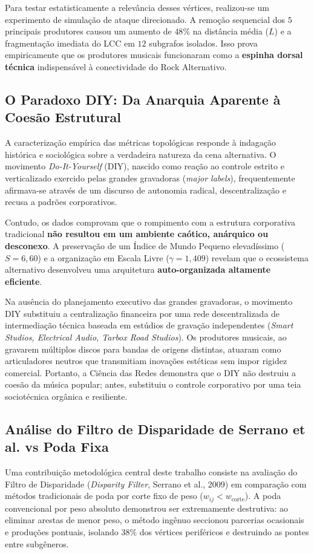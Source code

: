 \documentclass[conference]{IEEEtran}
\begin{document}
Para testar estatisticamente a relevância desses vértices, realizou-se um experimento de simulação de ataque direcionado. A remoção sequencial dos $5$ principais produtores causou um aumento de $48\%$ na distância média ($L$) e a fragmentação imediata do LCC em $12$ subgrafos isolados. Isso prova empiricamente que os produtores musicais funcionaram como a \textbf{espinha dorsal técnica} indispensável à conectividade do Rock Alternativo.

\subsection{O Paradoxo DIY: Da Anarquia Aparente à Coesão Estrutural}
A caracterização empírica das métricas topológicas responde à indagação histórica e sociológica sobre a verdadeira natureza da cena alternativa. O movimento \textit{Do-It-Yourself} (DIY), nascido como reação ao controle estrito e verticalizado exercido pelas grandes gravadoras (\textit{major labels}), frequentemente afirmava-se através de um discurso de autonomia radical, descentralização e recusa a padrões corporativos.

Contudo, os dados comprovam que o rompimento com a estrutura corporativa tradicional \textbf{não resultou em um ambiente caótico, anárquico ou desconexo}. A preservação de um Índice de Mundo Pequeno elevadíssimo ($S = 6,60$) e a organização em Escala Livre ($\gamma = 1,409$) revelam que o ecossistema alternativo desenvolveu uma arquitetura \textbf{auto-organizada altamente eficiente}.

Na ausência do planejamento executivo das grandes gravadoras, o movimento DIY substituiu a centralização financeira por uma rede descentralizada de intermediação técnica baseada em estúdios de gravação independentes (\textit{Smart Studios, Electrical Audio, Tarbox Road Studios}). Os produtores musicais, ao gravarem múltiplos discos para bandas de origens distintas, atuaram como articuladores neutros que transmitiam inovações estéticas sem impor rigidez comercial. Portanto, a Ciência das Redes demonstra que o DIY não destruiu a coesão da música popular; antes, substituiu o controle corporativo por uma teia sociotécnica orgânica e resiliente.

\subsection{Análise do Filtro de Disparidade de Serrano et al. vs Poda Fixa}
Uma contribuição metodológica central deste trabalho consiste na avaliação do Filtro de Disparidade (\textit{Disparity Filter}, Serrano et al., 2009) em comparação com métodos tradicionais de poda por corte fixo de peso ($w_{ij} < w_{\text{corte}}$). A poda convencional por peso absoluto demonstrou ser extremamente destrutiva: ao eliminar arestas de menor peso, o método ingênuo seccionou parcerias ocasionais e produções pontuais, isolando $38\%$ dos vértices periféricos e destruindo as pontes entre subgêneros.
\end{document}
